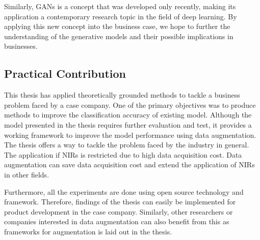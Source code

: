 Similarly, GANs is a concept that was developed only recently, making its application a contemporary research topic in the field of deep learning. By applying this new concept into the business case, we hope to further the understanding of the generative models and their possible implications in businesses.


\subsection{Practical Contribution}

This thesis has applied theoretically grounded methods to tackle a business problem faced by a case company. One of the primary objectives was to produce methods to improve the classification accuracy of existing model. Although the model presented in the thesis requires further evaluation and test, it provides a working framework to improve the model performance using data augmentation. The thesis offers a way to tackle the problem faced by the industry in general. The application if NIRs is restricted due to high data acquisition cost. Data augmentation can save data acquisition cost and extend the application of NIRs in other fields.


Furthermore, all the experiments are done using open source technology and framework. Therefore, findings of the thesis can easily be implemented for product development in the case company. Similarly, other researchers or companies interested in data augmentation can also benefit from this as frameworks for augmentation is laid out in the thesis.


 
